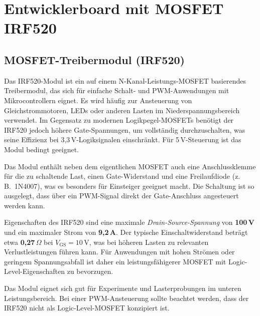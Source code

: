 %
%

\chapter{Entwicklerboard mit MOSFET IRF520}
\label{sec:mosfet}

\section{MOSFET-Treibermodul (IRF520)}

Das IRF520-Modul ist ein auf einem N-Kanal-Leistungs-MOSFET basierendes Treibermodul, das sich für einfache Schalt- und PWM-Anwendungen mit Mikrocontrollern eignet. Es wird häufig zur Ansteuerung von Gleichstrommotoren, LEDs oder anderen Lasten im Niederspannungsbereich verwendet. Im Gegensatz zu modernen Logikpegel-MOSFETs benötigt der IRF520 jedoch höhere Gate-Spannungen, um vollständig durchzuschalten, was seine Effizienz bei 3,3\,V-Logiksignalen einschränkt. Für 5\,V-Steuerung ist das Modul bedingt geeignet.\cite{OpenPlatform.cc.2020}

Das Modul enthält neben dem eigentlichen MOSFET auch eine Anschlussklemme für die zu schaltende Last, einen Gate-Widerstand und eine Freilaufdiode (z.\,B.\ 1N4007), was es besonders für Einsteiger geeignet macht. Die Schaltung ist so ausgelegt, dass über ein PWM-Signal direkt der Gate-Anschluss angesteuert werden kann.

Eigenschaften des IRF520 sind eine maximale \textit{Drain-Source-Spannung} von \textbf{100\,V} und ein maximaler Strom von \textbf{9,2\,A}. Der typische Einschaltwiderstand beträgt etwa \textbf{0{,}27\,$\Omega$} bei $V_{\text{GS}} = 10\,\text{V}$, was bei höheren Lasten zu relevanten Verlustleistungen führen kann. Für Anwendungen mit hohen Strömen oder geringem Spannungsabfall ist daher ein leistungsfähigerer MOSFET mit Logic-Level-Eigenschaften zu bevorzugen.

Das Modul eignet sich gut für Experimente und Lasterprobungen im unteren Leistungsbereich. Bei einer PWM-Ansteuerung sollte beachtet werden, dass der IRF520 nicht als Logic-Level-MOSFET konzipiert ist.

